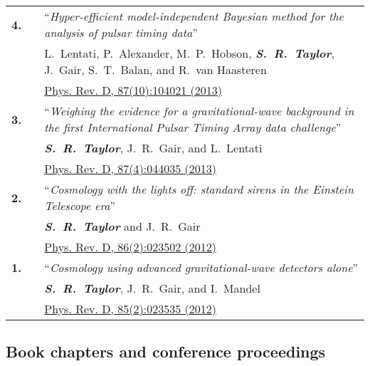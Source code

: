 \documentclass[11pt,letterpaper,sans]{moderncv}
\begin{document}
{\begin{longtable}{rp{0.3cm}p{15.8cm}}
\textbf{4.} & & ``\textit{Hyper-efficient model-independent Bayesian method for the analysis of pulsar timing data}'' \\ 
&& L.~Lentati, P.~Alexander, M.~P.~Hobson, \textit{\textbf{S.~R.~Taylor}}, J.~Gair, S.~T.~Balan, and R.~van Haasteren \\ 
&& \href{http://journals.aps.org/prd/abstract/10.1103/PhysRevD.87.104021}{{\color{color1} Phys. Rev. D, 87(10):104021 (2013)}} \vspace{0.09cm}\\
\textbf{3.} & & ``\textit{Weighing the evidence for a gravitational-wave background in the first International Pulsar Timing Array data challenge}'' \\ 
&& \textit{\textbf{S.~R.~Taylor}}, J.~R.~Gair, and L.~Lentati \\ 
&& \href{http://journals.aps.org/prd/abstract/10.1103/PhysRevD.87.044035}{{\color{color1} Phys. Rev. D, 87(4):044035 (2013)}} \vspace{0.09cm}\\
\textbf{2.} & & ``\textit{Cosmology with the lights off: standard sirens in the Einstein Telescope era}'' \\ 
&& \textit{\textbf{S.~R.~Taylor}} and J.~R.~Gair \\ 
&& \href{http://journals.aps.org/prd/abstract/10.1103/PhysRevD.86.023502}{{\color{color1} Phys. Rev. D, 86(2):023502 (2012)}} \vspace{0.09cm}\\
\textbf{1.} & & ``\textit{Cosmology using advanced gravitational-wave detectors alone}'' \\ 
&& \textit{\textbf{S.~R.~Taylor}}, J.~R.~Gair, and I.~Mandel \\ 
&& \href{http://journals.aps.org/prd/abstract/10.1103/PhysRevD.85.023535}{{\color{color1} Phys. Rev. D, 85(2):023535 (2012)}} \vspace{0.09cm}\\
\end{longtable}
}

\subsection{Book chapters and conference proceedings} \vspace{-0.3cm}
\end{document}
